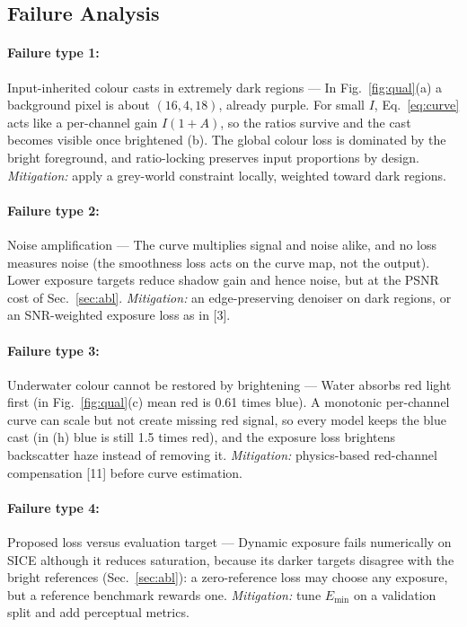 \documentclass[11pt, letterpaper]{article}
\begin{document}
\subsection{Failure Analysis}
\label{sec:failure}

\paragraph{Failure type 1:} Input-inherited colour casts in extremely dark regions ---
In Fig.~\ref{fig:qual}(a) a background pixel is about $(16, 4, 18)$, already
purple. For small $I$, Eq.~\eqref{eq:curve} acts like a per-channel gain $I(1+A)$,
so the ratios survive and the cast becomes visible once brightened (b). The global
colour loss is dominated by the bright foreground, and ratio-locking preserves input
proportions by design. \emph{Mitigation:}
apply a grey-world constraint locally, weighted toward dark regions.

\paragraph{Failure type 2:} Noise amplification --- The curve multiplies signal and noise
alike, and no loss measures noise (the smoothness loss acts on the curve map, not
the output). Lower exposure targets reduce shadow gain and hence noise, but at the
PSNR cost of Sec.~\ref{sec:abl}.
\emph{Mitigation:} an edge-preserving denoiser on dark regions, or an SNR-weighted
exposure loss as in [3].

\paragraph{Failure type 3:} Underwater colour cannot be restored by brightening ---
Water absorbs red light first (in Fig.~\ref{fig:qual}(c) mean red is 0.61 times
blue). A monotonic per-channel curve can scale but not create missing red signal, so
every model keeps the blue cast (in (h) blue is still 1.5 times red), and the
exposure loss brightens backscatter haze instead of removing it.
\emph{Mitigation:} physics-based red-channel compensation [11] before curve
estimation.

\paragraph{Failure type 4:} Proposed loss versus evaluation target --- Dynamic
exposure fails numerically on SICE although it reduces saturation, because its
darker targets disagree with the bright references (Sec.~\ref{sec:abl}): a
zero-reference loss may choose any exposure, but a reference benchmark rewards one. \emph{Mitigation:} tune $E_{\min}$
on a validation split and add perceptual metrics.
\end{document}
